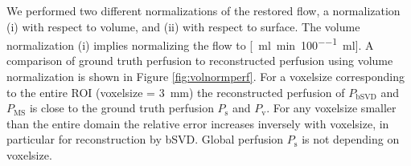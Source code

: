 \documentclass[final,5p,times,twocolumn]{elsarticle}
\begin{document}
	We performed two different normalizations of the restored flow, a normalization (i) with respect to volume, and (ii) with respect to surface.  %
The volume normalization (i) implies normalizing the flow to  [\SI{}{\milli\litre\per\minute\per100\milli\litre}]. A comparison of ground truth perfusion to reconstructed perfusion using volume normalization is shown in Figure \ref{fig:volnormperf}. For a voxelsize corresponding to the entire ROI (voxelsize = \SI{3}{\milli\meter}) the reconstructed perfusion of $P_{\mathrm{bSVD}}$ and $P_{\mathrm{MS}}$ is close to the ground truth perfusion $P_{\mathrm{s}}$ and $P_{\mathrm{v}}$. For any voxelsize smaller than the entire domain the relative error increases inversely with voxelsize, in particular for reconstruction by bSVD. Global perfusion $P_{\mathrm{s}}$ is not depending on voxelsize.
\end{document}
